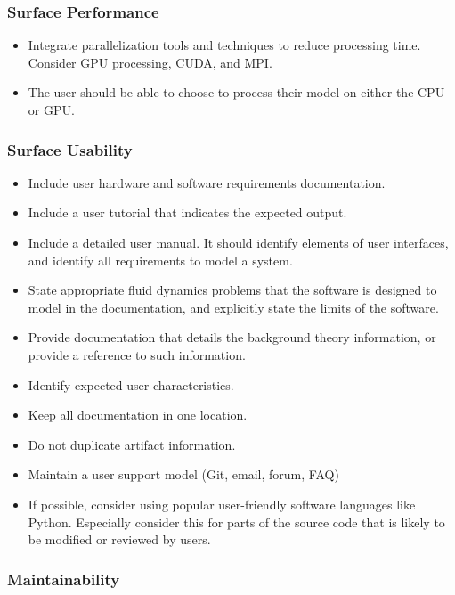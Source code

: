 \documentclass[12pt, notitlepage]{article}
\begin{document}
\subsubsection{Surface Performance}

\begin{itemize}
	\item Integrate parallelization tools and techniques to reduce processing time. Consider GPU processing, CUDA, and MPI. 
	\item The user should be able to choose to process their model on either the CPU or GPU.
\end{itemize}

\subsubsection{Surface Usability}

\begin{itemize}
	\item Include user hardware and software requirements documentation.
	\item Include a user tutorial that indicates the expected output.
	\item Include a detailed user manual. It should identify elements of user interfaces, and identify all requirements to model a system.	
	\item State appropriate fluid dynamics problems that the software is designed to model in the documentation, and explicitly state the limits of the software. 
	\item Provide documentation that details the background theory information, or provide a reference to such information.
	\item Identify expected user characteristics.
	\item Keep all documentation in one location.
	\item Do not duplicate artifact information.
	\item Maintain a user support model (Git, email, forum, FAQ)
	\item If possible, consider using popular user-friendly software languages like Python. Especially consider this for parts of the source code that is likely to be modified or reviewed by users.
\end{itemize}

\subsubsection{Maintainability}
\end{document}
